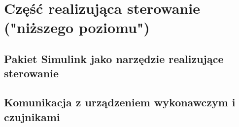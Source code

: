 \section{Część realizująca sterowanie ("niższego poziomu")}
\label{sec:czesc-nizsza}


\subsection{Pakiet Simulink jako narzędzie realizujące sterowanie}
\label{sub:czesc-nizsza-matlab}


\subsection{Komunikacja z urządzeniem wykonawczym i czujnikami}
\label{sub:czesc-nizsza-komunikacja}
